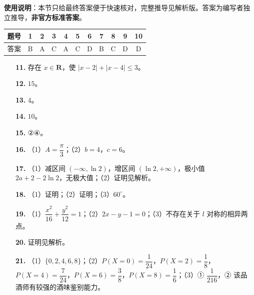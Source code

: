 
\begin{gknotice}
\textbf{使用说明}：本节只给最终答案便于快速核对，完整推导见解析版。答案为编写者独立推导，\textbf{非官方标准答案}。
\end{gknotice}

\begin{center}\begin{tabular}{ccccccccccc}
\toprule
题号 & 1 & 2 & 3 & 4 & 5 & 6 & 7 & 8 & 9 & 10 \\
\midrule
答案 & B & A & C & A & C & D & B & C & D & D \\
\bottomrule
\end{tabular}\end{center}

\begin{itemize}[leftmargin=2.6em]
  \item[\textbf{11.}] 存在 $x\in\mathbf R$，使 $\lvert x-2\rvert+\lvert x-4\rvert\leqslant3$。
  \item[\textbf{12.}] $15$。
  \item[\textbf{13.}] $4$。
  \item[\textbf{14.}] $10$。
  \item[\textbf{15.}] ②④。
\end{itemize}

\begin{itemize}[leftmargin=2.6em]
  \item[\textbf{16.}] （1）$A=\dfrac\pi3$；（2）$b=4$，$c=6$。
  \item[\textbf{17.}] （1）减区间 $(-\infty,\ln2)$，增区间 $(\ln2,+\infty)$，极小值 $2a+2-2\ln2$，无极大值；（2）证明见解析。
  \item[\textbf{18.}] （1）证明；（2）证明；（3）$60^\circ$。
  \item[\textbf{19.}] （1）$\dfrac{x^2}{16}+\dfrac{y^2}{12}=1$；（2）$2x-y-1=0$；（3）不存在关于 $l$ 对称的相异两点。
  \item[\textbf{20.}] 证明见解析。
  \item[\textbf{21.}] （1）$\{0,2,4,6,8\}$；（2）$P(X=0)=\dfrac1{24}$，$P(X=2)=\dfrac18$，$P(X=4)=\dfrac7{24}$，$P(X=6)=\dfrac38$，$P(X=8)=\dfrac16$；（3）① $\dfrac1{216}$，② 该品酒师有较强的酒味鉴别能力。
\end{itemize}
